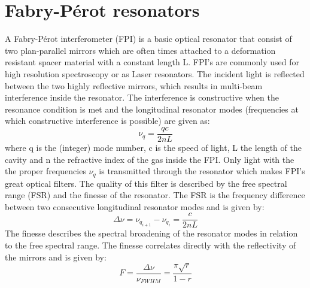 \section{Fabry-Pérot resonators}
A Fabry-Pérot interferometer (FPI) is a basic optical resonator that consist of two plan-parallel mirrors which are often times attached to a deformation resistant spacer material with a constant length L. FPI's are commonly used for high resolution spectroscopy or as Laser resonators. The incident light is reflected between the two highly reflective mirrors, which results in multi-beam interference inside the resonator. The interference is constructive when the resonance condition is met and the longitudinal resonator modes (frequencies at which constructive interference is possible) are given as:
\begin{equation}
	\nu_q = \frac{qc}{2nL}
	\label{resonacne_condition_FPI}
\end{equation}
where q is the (integer) mode number,  c is the speed of light, L the length of the cavity and n the refractive index of the gas inside the FPI. Only light with the the proper frequencies $\nu_q$ is transmitted through the resonator which makes FPI's great optical filters. The quality of this filter is described by the free spectral range (FSR) and the finesse of the resonator. The FSR is the frequency difference between two consecutive longitudinal resonator modes and is given by:
\begin{equation}
	\Delta \nu = \nu_{q_{i+1}} - \nu_{q_i} = \frac{c}{2nL}
	\label{Free_spectral_range_of_FPI}
\end{equation}
The finesse describes the spectral broadening of the resonator modes in relation to the free spectral range. The finesse correlates directly with the reflectivity of the mirrors and is given by:
\begin{equation}
	F= \frac{\Delta \nu}{\nu_{\scriptscriptstyle FWHM}} =\frac{ \pi \sqrt{r}}{1 - r}
	\label{Finesse_of_FPI}
\end{equation}
